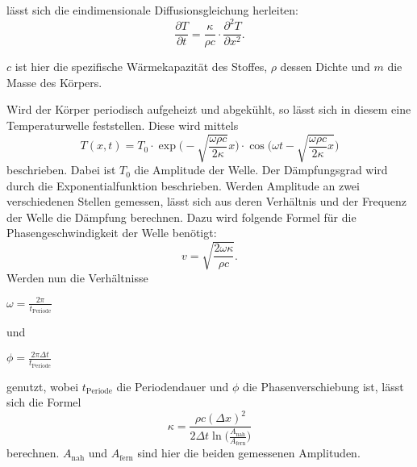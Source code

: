 lässt sich die eindimensionale Diffusionsgleichung herleiten:
\begin{equation}
\label{eqn:diffusion}
    \frac{\partial T}{\partial t} = \frac{\kappa}{\rho c} \cdot \frac{\partial^2 T}{\partial x^2}    .
\end{equation}

$c$ ist hier die spezifische Wärmekapazität des Stoffes, $\rho$ dessen Dichte und $m$ die Masse des Körpers.

Wird der Körper periodisch aufgeheizt und abgekühlt, so lässt sich in diesem eine Temperaturwelle feststellen.
Diese wird mittels
\begin{equation}
\label{eqn:term-welle}
    T(x, t) = T_0 \cdot \exp \bigg( -\sqrt{\frac{\omega \rho c}{2 \kappa}} x \bigg) \cdot \cos\bigg( \omega t - \sqrt{\frac{\omega \rho c}{2 \kappa} x} \bigg)
\end{equation}
beschrieben. Dabei ist $T_0$ die Amplitude der Welle. Der Dämpfungsgrad wird durch die Exponentialfunktion beschrieben.
Werden Amplitude an zwei verschiedenen Stellen gemessen, lässt sich aus deren Verhältnis und der Frequenz der Welle die Dämpfung berechnen.
Dazu wird folgende Formel für die Phasengeschwindigkeit der Welle benötigt:
\begin{equation}
\label{eqn:phasengeschwindigkeit}
    v = \sqrt{\frac{2 \omega \kappa}{\rho c}}  .
\end{equation}
Werden nun die Verhältnisse 

\centerline{$\omega = \frac{2 \pi}{t_\text{Periode}}$}

und

\centerline{$\phi = \frac{2 \pi \Delta t}{t_\text{Periode}}$}

genutzt, wobei $t_\text{Periode}$ die Periodendauer und $\phi$ die Phasenverschiebung ist, lässt sich die Formel
\begin{equation}
\label{eqn:leitfaehigkeit}
    \kappa = \frac{\rho c (\Delta x)^2}{2 \Delta t \ln \Big(\frac{A_\text{nah}}{A_\text{fern}}\Big)}
\end{equation}
berechnen. $A_\text{nah}$ und $A_\text{fern}$ sind hier die beiden gemessenen Amplituden.